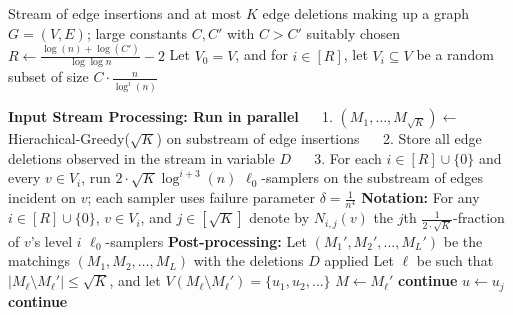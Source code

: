 \documentclass[11pt,a4paper]{article}
\begin{document}
\begin{algorithm}[h!]
    \begin{algorithmic}[1]
        \REQUIRE Stream of edge insertions and at most $K$ edge deletions making up a graph $G=(V, E)$; large constants $C,C'$  with $C > C'$ suitably chosen \vspace{0.15cm}
        \STATE $R \gets \frac{\log(n) + \log(C')}{\log \log n} - 2$ 
        \STATE Let $V_0 = V$, and for $i \in [R]$, let $V_i \subseteq V$ be a random subset of size $C \cdot \frac{n}{\log^i(n)}$\vspace{0.3cm}
        
        \STATE \textbf{Input Stream Processing: Run in parallel}
        \STATE $\quad$ 1. $(M_1, \dots, M_{\sqrt{K}}) \gets $ \textsf{Hierachical-Greedy}($\sqrt{K}$) on substream of edge insertions
        \STATE $\quad$ 2. Store all edge deletions observed in the stream in variable $D$
        \STATE $\quad$ 3. For each $i \in [R] \cup \{0 \}$ and every $v \in V_i$, run $2 \cdot \sqrt{K}\log^{i+3}(n)$ $\ell_0$-samplers on the substream of edges incident on $v$; each sampler uses failure parameter $\delta = \frac{1}{n^4}$ \vspace{0.15cm}
        \STATE \textbf{Notation:} For any $i \in [R] \cup \{0 \}$, $v \in V_i$, and $j \in [\sqrt{K}]$ denote by $N_{i,j}(v)$ the $j$th $\frac{1}{2 \cdot \sqrt{K}}$-fraction of $v$'s level $i$ $\ell_0$-samplers \vspace{0.3cm}        
        \STATE \textbf{Post-processing:}
        \STATE Let $(M_1', M_2', \dots, M_L')$ be the matchings $(M_1, M_2, \dots, M_L)$ with the deletions $D$ applied \label{line:apply-del}
        \STATE Let $\ell$ be such that $|M_{\ell} \setminus M_{\ell}'| \le \sqrt{K}$, and let $V(M_{\ell} \setminus M_{\ell}') = \{u_1, u_2, \dots \}$ 
        \STATE $M \gets M_{\ell}'$ \label{line:del} 
         \label{line:loop-repair}
             \label{line:accidental-fix}
                \STATE \textbf{continue} 
            \ENDIF
            \STATE $u \gets u_j$            
             \label{line:loop}
             \label{line:entire-neighborhood}
                \STATE \textbf{continue} 

\end{algorithmic}
\end{algorithm}
\end{document}
